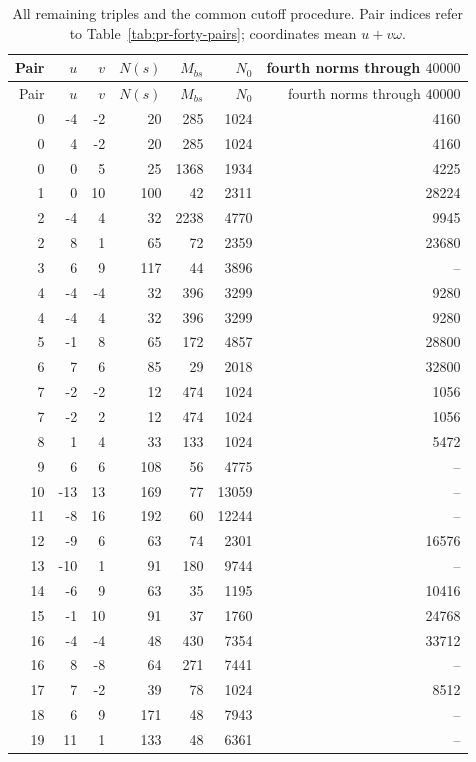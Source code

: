 \documentclass[12pt]{article}
\numberwithin{equation}{section}
\begin{document}
\begin{longtable}{r|r r|r|r|r|r}
\caption{All remaining triples and the common cutoff procedure. Pair indices refer to Table~\ref{tab:pr-forty-pairs}; coordinates mean $u+v\omega$.}\label{tab:fixed56}\\
Pair&$u$&$v$&$N(s)$&$M_{bs}$&$N_0$&fourth norms through $40000$\\\hline
\endfirsthead
Pair&$u$&$v$&$N(s)$&$M_{bs}$&$N_0$&fourth norms through $40000$\\\hline
\endhead
0 & -4 & -2 & 20 & 285 & 1024 & 4160 \\
0 & 4 & -2 & 20 & 285 & 1024 & 4160 \\
0 & 0 & 5 & 25 & 1368 & 1934 & 4225 \\
1 & 0 & 10 & 100 & 42 & 2311 & 28224 \\
2 & -4 & 4 & 32 & 2238 & 4770 & 9945 \\
2 & 8 & 1 & 65 & 72 & 2359 & 23680 \\
3 & 6 & 9 & 117 & 44 & 3896 & -- \\
4 & -4 & -4 & 32 & 396 & 3299 & 9280 \\
4 & -4 & 4 & 32 & 396 & 3299 & 9280 \\
5 & -1 & 8 & 65 & 172 & 4857 & 28800 \\
6 & 7 & 6 & 85 & 29 & 2018 & 32800 \\
7 & -2 & -2 & 12 & 474 & 1024 & 1056 \\
7 & -2 & 2 & 12 & 474 & 1024 & 1056 \\
8 & 1 & 4 & 33 & 133 & 1024 & 5472 \\
9 & 6 & 6 & 108 & 56 & 4775 & -- \\
10 & -13 & 13 & 169 & 77 & 13059 & -- \\
11 & -8 & 16 & 192 & 60 & 12244 & -- \\
12 & -9 & 6 & 63 & 74 & 2301 & 16576 \\
13 & -10 & 1 & 91 & 180 & 9744 & -- \\
14 & -6 & 9 & 63 & 35 & 1195 & 10416 \\
15 & -1 & 10 & 91 & 37 & 1760 & 24768 \\
16 & -4 & -4 & 48 & 430 & 7354 & 33712 \\
16 & 8 & -8 & 64 & 271 & 7441 & -- \\
17 & 7 & -2 & 39 & 78 & 1024 & 8512 \\
18 & 6 & 9 & 171 & 48 & 7943 & -- \\
19 & 11 & 1 & 133 & 48 & 6361 & -- \\

\end{longtable}
\end{document}
